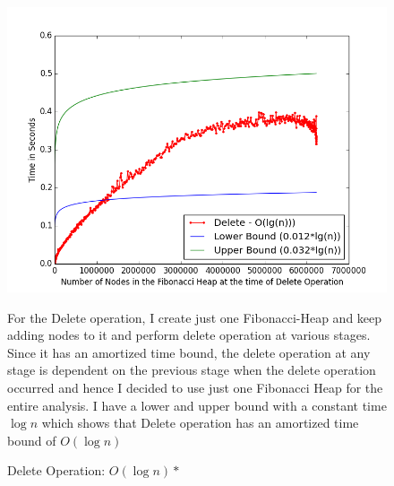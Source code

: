 \begin{figure}
\includegraphics[width=0.95\columnwidth]{Figures/fibonacciHeapPerformanceDelete}
\caption{Delete Operation: $O(\log{n})*$}
\label{performanceDelete}
For the Delete operation, I create just one Fibonacci-Heap and keep adding nodes to it and perform delete operation at various stages. Since it has an amortized time bound, the delete operation at any stage is dependent on the previous stage when the delete operation occurred and hence I decided to use just one Fibonacci Heap for the entire analysis. I have a lower and upper bound with a constant time $\log{n}$ which shows that Delete operation has an amortized time bound of $O(\log{n})$
\end{figure}


